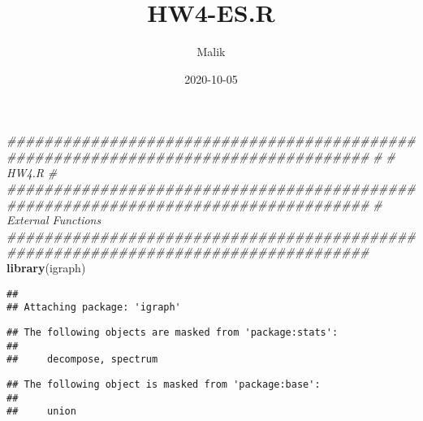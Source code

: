 \documentclass[
]{article}
\title{HW4-ES.R}
\author{Malik}
\date{2020-10-05}
\newenvironment{Shaded}{\begin{snugshade}}{\end{snugshade}}
\newcommand{\CommentTok}[1]{\textcolor[rgb]{0.56,0.35,0.01}{\textit{#1}}}
\newcommand{\KeywordTok}[1]{\textcolor[rgb]{0.13,0.29,0.53}{\textbf{#1}}}
\newcommand{\NormalTok}[1]{#1}
\begin{document}
\maketitle

\begin{Shaded}
\begin{Highlighting}[]
\CommentTok{###################################################################################}
\CommentTok{#}
\CommentTok{# HW4.R}
\CommentTok{#}
\CommentTok{###################################################################################}
\CommentTok{# External Functions}
\CommentTok{###################################################################################}
\KeywordTok{library}\NormalTok{(igraph)}
\end{Highlighting}
\end{Shaded}

\begin{verbatim}
## 
## Attaching package: 'igraph'
\end{verbatim}

\begin{verbatim}
## The following objects are masked from 'package:stats':
## 
##     decompose, spectrum
\end{verbatim}

\begin{verbatim}
## The following object is masked from 'package:base':
## 
##     union
\end{verbatim}
\end{document}
